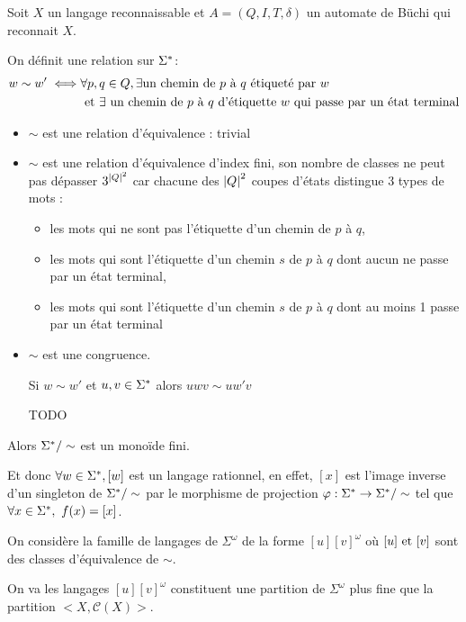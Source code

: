 Soit $X$ un langage reconnaissable et $A = (Q,I,T,\delta)$ un automate de Büchi qui reconnait $X$.


On définit une relation sur $\Sigma^{*}$:
\begin{eqnarray*}
	w \sim w' \iff &\forall p,q \in Q, \exists \text{un chemin de $p$ à $q$ étiqueté par } w \\
	&\text{ et } \exists \text{ un chemin de $p$ à $q$ d'étiquette $w$ qui passe par un état terminal}
\end{eqnarray*}


\begin{itemize}
	\item $\sim$ est une relation d'équivalence : trivial
	\item $\sim$ est une relation d'équivalence d'index fini, son nombre de classes ne peut pas dépasser $3^{{\left|Q\right|}^2}$
	      car chacune des ${\left|Q\right|}^2$ coupes d'états distingue 3 types de mots :
	      \begin{itemize}
		      \item les mots qui ne sont pas l'étiquette d'un chemin de $p$ à $q$,
		      \item les mots qui sont l'étiquette d'un chemin $s$ de $p$ à $q$ dont aucun ne passe par un état terminal,
		      \item les mots qui sont l'étiquette d'un chemin $s$ de $p$ à $q$ dont au moins 1 passe par un état terminal
	      \end{itemize}
	\item $\sim$ est une congruence.

	      Si $w \sim w'$ et $u,v \in \Sigma^{*}$ alors $uwv \sim uw'v$

	      TODO
\end{itemize}

Alors $\Sigma^{*} / \sim$ est un monoïde fini.

Et donc $\forall w \in \Sigma^{*}, [w]$ est un langage rationnel, en effet, $[x]$ est l'image inverse d'un singleton de $\Sigma^{*} / \sim$
par le morphisme de projection $\varphi : \Sigma^{*} \to \Sigma^{*} / \sim$ tel que $\forall x \in \Sigma^{*},\ f (x) = [x] $.


On considère la famille de langages de $\Sigma^{\omega}$ de la forme $[u][v]^{\omega}$ où $[u] \text{ et } [v]$ sont des classes d'équivalence de $\sim$.

On va \mq les langages $[u][v]^{\omega}$ constituent une partition de $\Sigma^{\omega}$ plus fine que la partition $<X,\mathcal{C}(X)>$.



